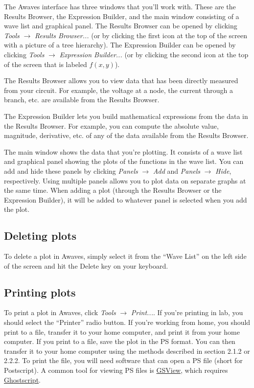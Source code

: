 \documentclass{article}
\begin{document}
The Awaves interface has three windows that you'll work with. These are the Results Browser, the Expression Builder, and the main window consisting of a wave list and graphical panel. The Results Browser can be opened by clicking \textit{Tools} $\rightarrow$ \textit{Results Browser...} (or by clicking the first icon at the top of the screen with a picture of a tree hierarchy). The Expression Builder can be opened by clicking \textit{Tools} $\rightarrow$ \textit{Expression Builder...} (or by clicking the second icon at the top of the screen that is labeled $f(x,y)$).

The Results Browser allows you to view data that has been directly measured from your circuit. For example, the voltage at a node, the current through a branch, etc. are available from the Results Browser.

The Expression Builder lets you build mathematical expressions from the data in the Results Browser. For example, you can compute the absolute value, magnitude, derivative, etc. of any of the data available from the Results Browser.

The main window shows the data that you're plotting. It consists of a wave list and graphical panel showing the plots of the functions in the wave list. You can add and hide these panels by clicking \textit{Panels} $\rightarrow$ \textit{Add} and \textit{Panels} $\rightarrow$ \textit{Hide}, respectively. Using multiple panels allows you to plot data on separate graphs at the same time. When adding a plot (through the Results Browser or the Expression Builder), it will be added to whatever panel is selected when you add the plot.

\subsection{Deleting plots}

To delete a plot in Awaves, simply select it from the ``Wave List'' on the left side of the screen and hit the Delete key on your keyboard.

\subsection{Printing plots}

To print a plot in Awaves, click \textit{Tools} $\rightarrow$ \textit{Print...}. If you're printing in lab, you should select the ``Printer'' radio button. If you're working from home, you should print to a file, transfer it to your home computer, and print it from your home computer. If you print to a file, save the plot in the PS format. You can then transfer it to your home computer using the methods described in section 2.1.2 or 2.2.2. To print the file, you will need software that can open a PS file (short for Postscript). A common tool for viewing PS files is \href{http://pages.cs.wisc.edu/~ghost/gsview/}{GSView}, which requires \href{http://pages.cs.wisc.edu/~ghost/doc/AFPL/index.htm}{Ghostscript}.
\end{document}
